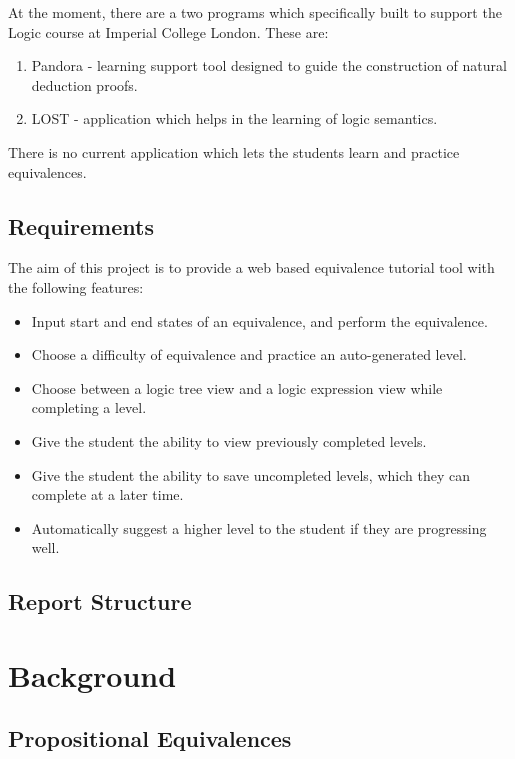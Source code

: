 \documentclass[12pt]{article}
\begin{document}
At the moment, there are a two programs which specifically built to support the
Logic course at Imperial College London. These are:

\begin{enumerate}
  \item Pandora - learning support tool designed to guide the construction of
         natural deduction proofs. 
  \item LOST - application which helps in the learning of logic semantics.
\end{enumerate}

There is no current application which lets the students learn and practice
equivalences.

\subsection{Requirements}

The aim of this project is to provide a web based equivalence tutorial tool
with the following features:

\begin{itemize}

	\item Input start and end states of an equivalence, and perform the
				equivalence.
	\item Choose a difficulty of equivalence and practice an auto-generated
				level.
	\item Choose between a logic tree view and a logic expression view while
				completing a level.
	\item Give the student the ability to view previously completed levels.
	\item Give the student the ability to save uncompleted levels, which they
				can complete at a later time.
	\item Automatically suggest a higher level to the student if they are
				progressing well.
\end{itemize}

\subsection{Report Structure}

\newpage


\section{Background}
\subsection{Propositional Equivalences}
\end{document}

